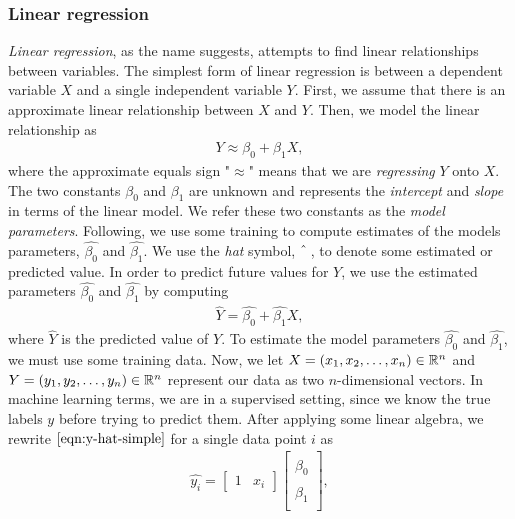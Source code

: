 \subsubsection{Linear regression}
\label{sec:linear-regression}
\textit{Linear regression}, as the name suggests, attempts to find linear relationships between variables. The simplest form of linear regression is between a dependent variable $X$ and a single independent variable $Y$. First, we assume that there is an approximate linear relationship between $X$ and $Y$. Then, we model the linear relationship as
\begin{align}
    Y \approx \beta_0 + \beta_1 X,
\end{align}
where the approximate equals sign "$\approx$" means that we are \textit{regressing} $Y$ onto $X$. The two constants $\beta_0$ and $\beta_1$ are unknown and represents the \textit{intercept} and \textit{slope} in terms of the linear model. We refer these two constants as the \textit{model parameters}. Following, we use some training to compute estimates of the models parameters, $\hat{\beta_0}$ and $\hat{\beta_1}$. We use the \textit{hat} symbol, $\string^$\,, to denote some estimated or predicted value. In order to predict future values for $Y$, we use the estimated parameters $\hat{\beta_0}$ and $\hat{\beta_1}$ by computing
\begin{align}
    \hat{Y} = \hat{\beta_0} + \hat{\beta_1}X,
    \label{eqn:y-hat-simple}
\end{align}
where $\hat{Y}$ is the predicted value of $Y$. To estimate the model parameters $\hat{\beta_0}$ and $\hat{\beta_1}$, we must use some training data. Now, we let $X = (x_1, x_2, \ldots, x_n) \in \mathbb{R}^n$ and $Y = (y_1, y_2, \ldots, y_n) \in \mathbb{R}^n$ represent our data as two $n$-dimensional vectors. In machine learning terms, we are in a supervised setting, since we know the true labels $y$ before trying to predict them. After applying some linear algebra, we rewrite $\cref{eqn:y-hat-simple}$ for a single data point $i$ as
\begin{align}
    \hat{y_i} =
        \begin{bmatrix}
            1 & x_i
        \end{bmatrix}
        \begin{bmatrix}
            \hat{\beta}_0 \\
            \hat{\beta}_1 \\
        \end{bmatrix},
    \label{eqn:y-hat-two-matrix-form-single-point}
\end{align}
